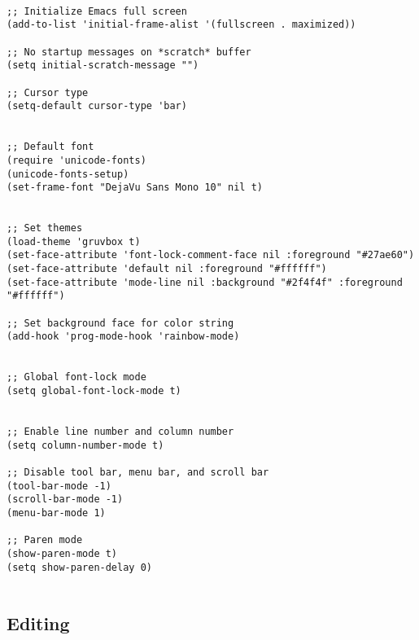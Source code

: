 \documentclass[11pt]{article}
\begin{document}
\begin{verbatim}

;; Initialize Emacs full screen 
(add-to-list 'initial-frame-alist '(fullscreen . maximized))

;; No startup messages on *scratch* buffer
(setq initial-scratch-message "")

;; Cursor type
(setq-default cursor-type 'bar)


;; Default font
(require 'unicode-fonts)
(unicode-fonts-setup)
(set-frame-font "DejaVu Sans Mono 10" nil t)


;; Set themes
(load-theme 'gruvbox t)
(set-face-attribute 'font-lock-comment-face nil :foreground "#27ae60")
(set-face-attribute 'default nil :foreground "#ffffff")
(set-face-attribute 'mode-line nil :background "#2f4f4f" :foreground "#ffffff")

;; Set background face for color string
(add-hook 'prog-mode-hook 'rainbow-mode)


;; Global font-lock mode
(setq global-font-lock-mode t)


;; Enable line number and column number
(setq column-number-mode t)

;; Disable tool bar, menu bar, and scroll bar
(tool-bar-mode -1)
(scroll-bar-mode -1)
(menu-bar-mode 1)

;; Paren mode
(show-paren-mode t)
(setq show-paren-delay 0)


\end{verbatim}

\subsection{Editing}
\label{sec:org8e52687}
\end{document}
